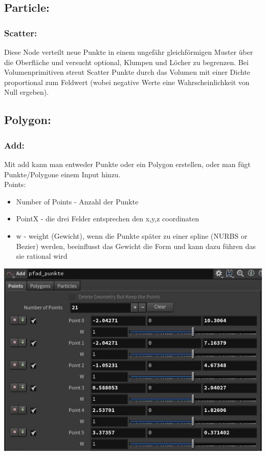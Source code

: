 \documentclass[paper=a4,fontsize=12pt,ngerman]{scrartcl}
\begin{document}
	\subsection*{Particle:}
	\subsubsection*{Scatter:}
	Diese Node verteilt neue Punkte in einem ungefähr gleichförmigen Muster über die Oberfläche und versucht optional, Klumpen und Löcher zu begrenzen. Bei Volumenprimitiven streut Scatter Punkte durch das Volumen mit einer Dichte proportional zum Feldwert (wobei negative Werte eine Wahrscheinlichkeit von Null ergeben).
	
	\subsection*{Polygon:}
	\subsubsection*{Add:}
	Mit add kann man entweder Punkte oder ein Polygon erstellen, oder man fügt Punkte/Polygone einem Input hinzu.\\
	Points:
	\begin{itemize}
		\item Number of Points - Anzahl der Punkte
		\item PointX - die drei Felder entsprechen den x,y,z coordinaten
		\item w - weight (Gewicht), wenn die Punkte später zu einer spline (NURBS or Bezier) werden, beeinflusst das Gewicht die Form und kann dazu führen das sie rational wird
	\end{itemize}
	\includegraphics*[width=\textwidth]{graphics/add.JPG}
\end{document}
